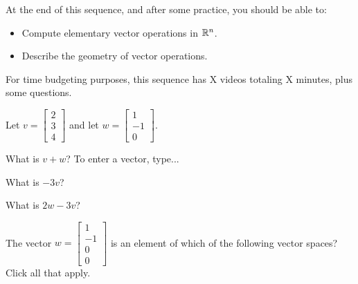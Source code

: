 







At the end of this sequence, and after some practice, you should be able to:

\begin{itemize}
\item Compute elementary vector operations in $\mathbb R^n$.  
\item Describe the geometry of vector operations.
\end{itemize}


For time budgeting purposes, this sequence has X videos totaling X minutes, 
plus some questions.  




\endedxtext

\endedxvertical









Let $v = \left[\begin{array}{c} 2 \\ 3  \\ 4 \end{array} \right]$ and let 
$w = \left[\begin{array}{c} 1 \\ -1  \\ 0 \end{array} \right].$


What is $v+w$?  
To enter a vector, type...


What is $-3v$?  




What is $2w-3v$?  



\edXsolution{ 
}


\endedxproblem




The vector $w = \left[\begin{array}{c} 1 \\ -1  \\ 0 \\ 0 \end{array} \right]$  is 
an element of which of the following vector spaces?  Click all that apply.  


